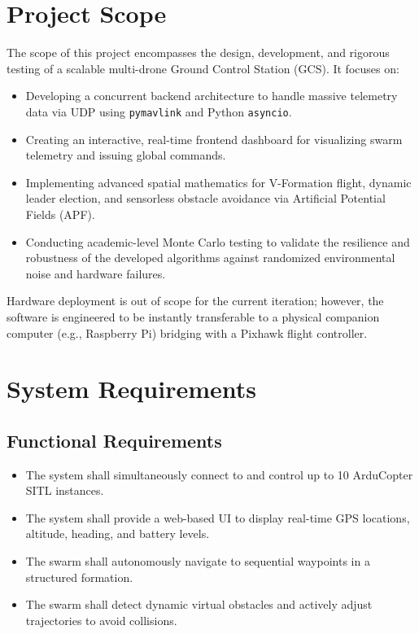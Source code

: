 \documentclass[11pt,a4paper]{article}
\newcommand{\code}[1]{\lstinline[basicstyle=\ttfamily\small,columns=fullflexible]|#1|}
\begin{document}
\section{Project Scope}
The scope of this project encompasses the design, development, and rigorous testing of a scalable multi-drone Ground Control Station (GCS). It focuses on:
\begin{itemize}[leftmargin=1.5em]
    \item Developing a concurrent backend architecture to handle massive telemetry data via UDP using \code{pymavlink} and Python \code{asyncio}.
    \item Creating an interactive, real-time frontend dashboard for visualizing swarm telemetry and issuing global commands.
    \item Implementing advanced spatial mathematics for V-Formation flight, dynamic leader election, and sensorless obstacle avoidance via Artificial Potential Fields (APF).
    \item Conducting academic-level Monte Carlo testing to validate the resilience and robustness of the developed algorithms against randomized environmental noise and hardware failures.
\end{itemize}
Hardware deployment is out of scope for the current iteration; however, the software is engineered to be instantly transferable to a physical companion computer (e.g., Raspberry Pi) bridging with a Pixhawk flight controller.

\section{System Requirements}
\subsection{Functional Requirements}
\begin{itemize}[leftmargin=1.5em]
    \item The system shall simultaneously connect to and control up to 10 ArduCopter SITL instances.
    \item The system shall provide a web-based UI to display real-time GPS locations, altitude, heading, and battery levels.
    \item The swarm shall autonomously navigate to sequential waypoints in a structured formation.
    \item The swarm shall detect dynamic virtual obstacles and actively adjust trajectories to avoid collisions.
\end{itemize}
\end{document}
